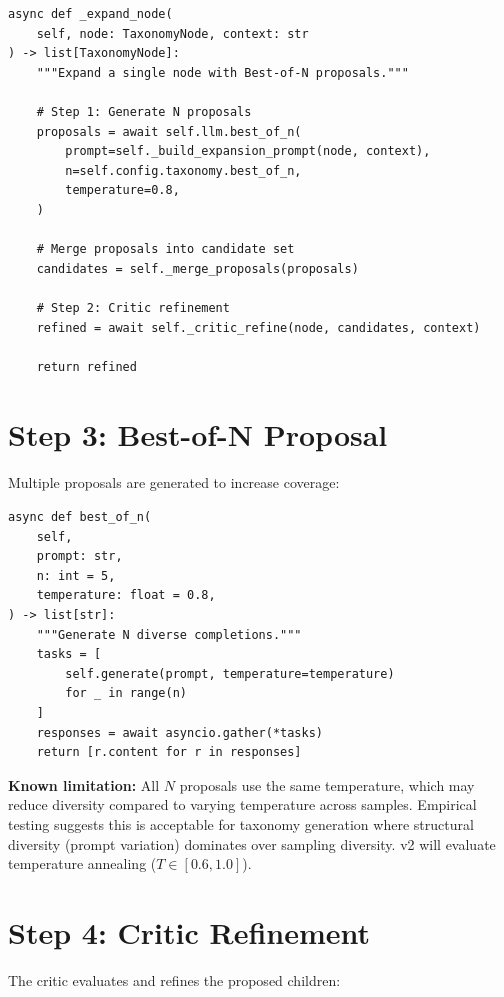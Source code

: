 \begin{lstlisting}[language=jsonx,caption={Node expansion (simula\_taxonomy\_builder.py, lines 180--220)}]
async def _expand_node(
    self, node: TaxonomyNode, context: str
) -> list[TaxonomyNode]:
    """Expand a single node with Best-of-N proposals."""
    
    # Step 1: Generate N proposals
    proposals = await self.llm.best_of_n(
        prompt=self._build_expansion_prompt(node, context),
        n=self.config.taxonomy.best_of_n,
        temperature=0.8,
    )
    
    # Merge proposals into candidate set
    candidates = self._merge_proposals(proposals)
    
    # Step 2: Critic refinement
    refined = await self._critic_refine(node, candidates, context)
    
    return refined
\end{lstlisting}

\section{Step 3: Best-of-N Proposal}

Multiple proposals are generated to increase coverage:

\begin{lstlisting}[language=jsonx,caption={Best-of-N sampling}]
async def best_of_n(
    self,
    prompt: str,
    n: int = 5,
    temperature: float = 0.8,
) -> list[str]:
    """Generate N diverse completions."""
    tasks = [
        self.generate(prompt, temperature=temperature)
        for _ in range(n)
    ]
    responses = await asyncio.gather(*tasks)
    return [r.content for r in responses]
\end{lstlisting}

\textbf{Known limitation:} All $N$ proposals use the same temperature, which may reduce 
diversity compared to varying temperature across samples. Empirical testing suggests 
this is acceptable for taxonomy generation where structural diversity (prompt variation) 
dominates over sampling diversity. v2 will evaluate temperature annealing ($T \in [0.6, 1.0]$).

\section{Step 4: Critic Refinement}

The critic evaluates and refines the proposed children:

